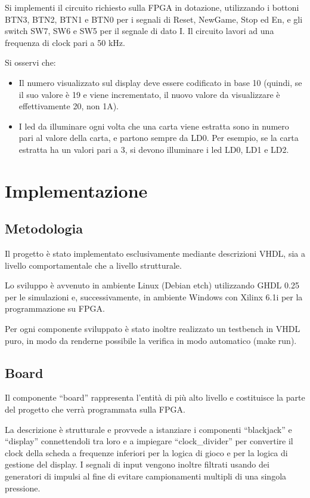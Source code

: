 \documentclass [11pt,a4paper,oneside,draft]{article}
\begin{document}
Si implementi il circuito richiesto sulla FPGA in dotazione, utilizzando i bottoni BTN3,
BTN2, BTN1 e BTN0 per i segnali di Reset, NewGame, Stop ed En, e gli switch
SW7, SW6 e SW5 per il segnale di dato I. Il circuito lavori ad una frequenza di clock
pari a 50 kHz.

Si osservi che:
\begin{itemize}
\item Il numero visualizzato sul display deve essere codificato in base 10 (quindi, se
      il suo valore è 19 e viene incrementato, il nuovo valore da visualizzare è
      effettivamente 20, non 1A).

\item I led da illuminare ogni volta che una carta viene estratta sono in numero pari
      al valore della carta, e partono sempre da LD0. Per esempio, se la carta
      estratta ha un valori pari a 3, si devono illuminare i led LD0, LD1 e LD2.
\end{itemize}


\section{Implementazione}
\subsection{Metodologia}
Il progetto è stato implementato esclusivamente mediante descrizioni VHDL, sia a
livello comportamentale che a livello strutturale.

Lo sviluppo è avvenuto in ambiente Linux (Debian etch) utilizzando GHDL 0.25 per le
simulazioni e, successivamente, in ambiente Windows con Xilinx 6.1i per la
programmazione su FPGA.

Per ogni componente sviluppato è stato inoltre realizzato un testbench in VHDL 
puro, in modo da renderne possibile la verifica in modo automatico (make run). %

\subsection{Board}
Il componente ``board'' rappresenta l'entità di più alto livello e costituisce
la parte del progetto che verrà programmata sulla FPGA.



La descrizione è strutturale e provvede a istanziare i componenti ``blackjack''
e ``display'' connettendoli tra loro e a impiegare ``clock\_divider'' per 
convertire il clock della scheda a frequenze inferiori per la logica di 
gioco e per la logica di gestione del display. I segnali di input vengono 
inoltre filtrati usando dei generatori di impulsi al fine di evitare 
campionamenti multipli di una singola pressione.
\end{document}
